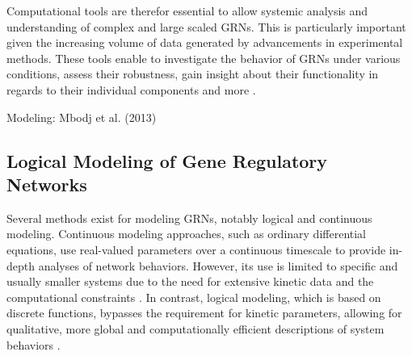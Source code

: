 Computational tools are therefor essential to allow systemic analysis and understanding of complex and large scaled GRNs. 
This is particularly important given the increasing volume of data generated by advancements in experimental methods. 
These tools enable to investigate the behavior of GRNs under various conditions, assess their robustness, gain insight about 
their functionality in regards to their individual components and more \cite{karlebach2008modelling}. 

Modeling:  Mbodj et al. (2013)\cite{mbodj2013logical}




\subsection{Logical Modeling of Gene Regulatory Networks}
Several methods exist for modeling GRNs, notably logical and continuous modeling. Continuous modeling approaches, 
such as ordinary differential equations, use real-valued parameters over a continuous timescale to provide in-depth analyses 
of network behaviors. However, its use is limited to specific and usually smaller systems due to the need for extensive kinetic 
data and the computational constraints \cite{karlebach2008modelling, wang2012boolean}. In contrast, logical modeling, 
which is based on discrete functions, bypasses the requirement for kinetic parameters, allowing for qualitative, 
more global and computationally efficient descriptions of system behaviors \cite{wang2012boolean}.

